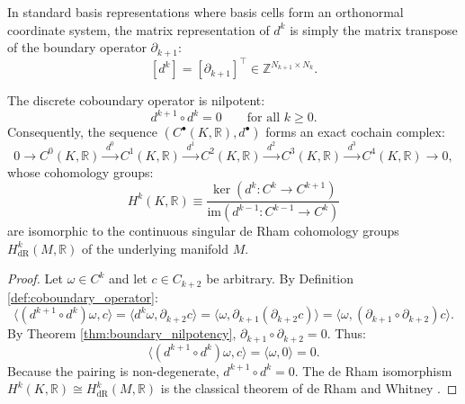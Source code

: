 In standard basis representations where basis cells form an orthonormal coordinate system, the matrix representation of $d^k$ is simply the matrix transpose of the boundary operator $\partial_{k+1}$:
\begin{equation}
\label{eq:coboundary_transpose_matrix}
[d^k] = [\partial_{k+1}]^\top \in \mathbb{Z}^{N_{k+1} \times N_k}.
\end{equation}

\begin{corollary}
\label{cor:coboundary_nilpotency}
The discrete coboundary operator is nilpotent:
\begin{equation}
\label{eq:coboundary_nilpotency}
d^{k+1} \circ d^k = 0 \qquad \text{for all } k \ge 0.
\end{equation}
Consequently, the sequence $(C^\bullet(K, \mathbb{R}), d^\bullet)$ forms an exact cochain complex:
\begin{equation}
\label{eq:discrete_cochain_complex}
0 \longrightarrow C^0(K, \mathbb{R}) \xrightarrow{\;d^0\;} C^1(K, \mathbb{R}) \xrightarrow{\;d^1\;} C^2(K, \mathbb{R}) \xrightarrow{\;d^2\;} C^3(K, \mathbb{R}) \xrightarrow{\;d^3\;} C^4(K, \mathbb{R}) \longrightarrow 0,
\end{equation}
whose cohomology groups:
\begin{equation}
\label{eq:simplicial_cohomology_def}
H^k(K, \mathbb{R}) \equiv \frac{\ker(d^k : C^k \to C^{k+1})}{\mathrm{im}(d^{k-1} : C^{k-1} \to C^k)}
\end{equation}
are isomorphic to the continuous singular de Rham cohomology groups $H_{\mathrm{dR}}^k(M, \mathbb{R})$ of the underlying manifold $M$.
\end{corollary}

\begin{proof}
Let $\omega \in C^k$ and let $c \in C_{k+2}$ be arbitrary. By Definition \ref{def:coboundary_operator}:
\begin{equation}
\langle (d^{k+1} \circ d^k) \omega, c \rangle = \langle d^k \omega, \partial_{k+2} c \rangle = \langle \omega, \partial_{k+1} (\partial_{k+2} c) \rangle = \langle \omega, (\partial_{k+1} \circ \partial_{k+2}) c \rangle.
\end{equation}
By Theorem \ref{thm:boundary_nilpotency}, $\partial_{k+1} \circ \partial_{k+2} = 0$. Thus:
\begin{equation}
\langle (d^{k+1} \circ d^k) \omega, c \rangle = \langle \omega, 0 \rangle = 0.
\end{equation}
Because the pairing is non-degenerate, $d^{k+1} \circ d^k = 0$. The de Rham isomorphism $H^k(K, \mathbb{R}) \cong H_{\mathrm{dR}}^k(M, \mathbb{R})$ is the classical theorem of de Rham and Whitney \cite{Whitney1957,deRham1984}.
\end{proof}

